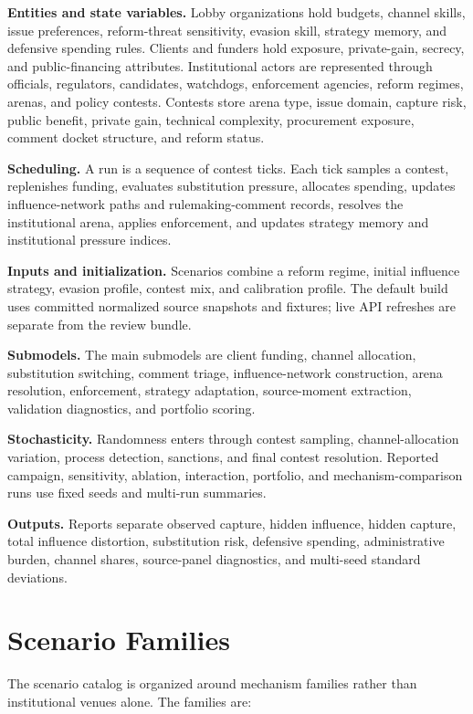 \textbf{Entities and state variables.} Lobby organizations hold budgets, channel skills, issue preferences, reform-threat sensitivity, evasion skill, strategy memory, and defensive spending rules. Clients and funders hold exposure, private-gain, secrecy, and public-financing attributes. Institutional actors are represented through officials, regulators, candidates, watchdogs, enforcement agencies, reform regimes, arenas, and policy contests. Contests store arena type, issue domain, capture risk, public benefit, private gain, technical complexity, procurement exposure, comment docket structure, and reform status.

\textbf{Scheduling.} A run is a sequence of contest ticks. Each tick samples a contest, replenishes funding, evaluates substitution pressure, allocates spending, updates influence-network paths and rulemaking-comment records, resolves the institutional arena, applies enforcement, and updates strategy memory and institutional pressure indices.

\textbf{Inputs and initialization.} Scenarios combine a reform regime, initial influence strategy, evasion profile, contest mix, and calibration profile. The default build uses committed normalized source snapshots and fixtures; live API refreshes are separate from the review bundle.

\textbf{Submodels.} The main submodels are client funding, channel allocation, substitution switching, comment triage, influence-network construction, arena resolution, enforcement, strategy adaptation, source-moment extraction, validation diagnostics, and portfolio scoring.

\textbf{Stochasticity.} Randomness enters through contest sampling, channel-allocation variation, process detection, sanctions, and final contest resolution. Reported campaign, sensitivity, ablation, interaction, portfolio, and mechanism-comparison runs use fixed seeds and multi-run summaries.

\textbf{Outputs.} Reports separate observed capture, hidden influence, hidden capture, total influence distortion, substitution risk, defensive spending, administrative burden, channel shares, source-panel diagnostics, and multi-seed standard deviations.

\section{Scenario Families}

The scenario catalog is organized around mechanism families rather than institutional venues alone. The families are:

